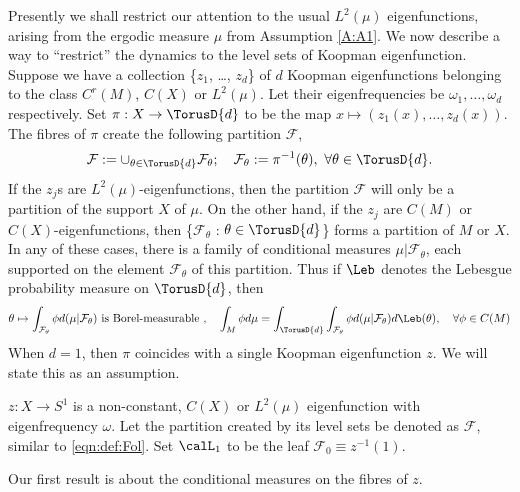 \documentclass[12pt,oneside]{article}
\newcommand{\Fol}{\mathcal{F}}
\begin{document}
Presently we shall restrict our attention to the usual $L^2(\mu)$ eigenfunctions, arising from the ergodic measure $\mu$ from Assumption \ref{A:A1}. We now describe a way to ``restrict'' the dynamics to the level sets of Koopman eigenfunction. Suppose we have a collection \{$z_{1}$, \ldots, $z_{d}$\} of $d$ Koopman eigenfunctions belonging to the class $C^r(M)$, $C(X)$ or $L^2(\mu)$. Let their eigenfrequencies  be $\omega_1,\ldots,\omega_d$ respectively. Set $\pi:X\to\TorusD{d}$ to be the map $x\mapsto \left(z_{1}(x), \ldots, z_{d}(x)\right)$. The fibres of $\pi$ create the following partition $\Fol$,
%
\begin{equation}\label{eqn:def:Fol}
\Fol:=\cup_{\theta\in\TorusD{d}}\Fol_\theta; \quad \Fol_\theta := \pi^{-1}(\theta),\ \forall\theta\in\TorusD{d}.
\end{equation}
%
If the $z_j$s are $L^2(\mu)$-eigenfunctions, then the partition $\Fol$ will only be a partition of the support $X$ of $\mu$. On the other hand, if the $z_j$ are $C(M)$ or $C(X)$-eigenfunctions, then \{$\Fol_\theta$ : $\theta\in\TorusD{d}$\} forms a partition of $M$ or $X$. In any of these cases, there is a family of conditional measures $\mu|\Fol_\theta$, each supported on the element $\Fol_\theta$ of this partition. Thus if $\Leb$ denotes the Lebesgue probability measure on $\TorusD{d}$, then
%
\[\theta\mapsto \int_{\Fol_\theta}\phi d(\mu|\Fol_\theta) \mbox{ is Borel-measurable } , \quad \int_M \phi d\mu = \int_{\TorusD{d}} \int_{\Fol_\theta}\phi d(\mu|\Fol_\theta) d \Leb(\theta) , \quad \forall \phi\in C(M)\]
%
When $d=1$, then $\pi$ coincides with a single Koopman eigenfunction $z$. We will state this as an assumption.

\begin{Assumption}\label{A:z}
$z:X\to S^1$ is a non-constant, $C(X)$ or $L^2(\mu)$ eigenfunction with eigenfrequency $\omega$. Let the partition created by its level sets be denoted as $\Fol$, similar to \eqref{eqn:def:Fol}. Set $\calL_1$ to be the leaf $\Fol_{0} \equiv z^{-1}(1)$.
\end{Assumption}

Our first result is about the conditional measures on the fibres of $z$. 
\end{document}
